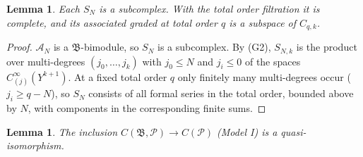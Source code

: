 \documentclass[11pt,oneside,reqno]{article}
\newcommand{\cA}{\mathcal A}
\newcommand{\cP}{\mathcal P}
\newcommand{\CI}{C^\infty}
\theoremstyle{plain}
\newtheorem{lemma}[theorem]{Lemma}
\theoremstyle{definition}
\theoremstyle{remark}
\begin{document}
\begin{lemma}\label{lem:mixedA}
Each \(S_N\) is a subcomplex. With the total order filtration it is complete, and its
associated graded at total order \(q\) is a subspace of \(C_{q,k}\).
\end{lemma}

\begin{proof}
\(\cA_N\) is a \(\mathfrak B\)-bimodule, so \(S_N\) is a subcomplex. By (G2), \(S_{N,k}\) is the product over
multi-degrees \((j_0,\dots,j_k)\) with \(j_0\le N\) and \(j_i\le0\) of the spaces \(\CI_{(j)}(Y^{k+1})\). At a fixed
total order \(q\) only finitely many multi-degrees occur (\(j_i\ge q-N\)), so \(S_N\) consists of all
formal series in the total order, bounded above by \(N\), with components in the
corresponding finite sums.
\end{proof}

\begin{lemma}\label{lem:mixedB}
The inclusion \(C(\mathfrak B,\cP)\to C(\cP)\) (Model I) is a quasi-isomorphism.
\end{lemma}
\end{document}
